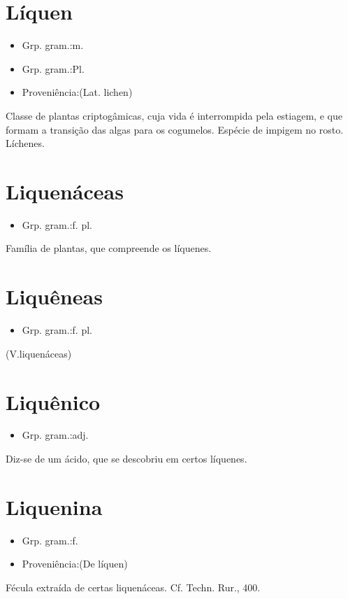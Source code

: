 \section{Líquen}
\begin{itemize}
\item {Grp. gram.:m.}
\end{itemize}
\begin{itemize}
\item {Grp. gram.:Pl.}
\end{itemize}
\begin{itemize}
\item {Proveniência:(Lat. \textunderscore lichen\textunderscore )}
\end{itemize}
Classe de plantas criptogâmicas, cuja vida é interrompida pela estiagem, e que formam a transição das algas para os cogumelos.
Espécie de impigem no rosto.
Líchenes.
\section{Liquenáceas}
\begin{itemize}
\item {Grp. gram.:f. pl.}
\end{itemize}
Família de plantas, que compreende os líquenes.
\section{Liquêneas}
\begin{itemize}
\item {Grp. gram.:f. pl.}
\end{itemize}
(V.liquenáceas)
\section{Liquênico}
\begin{itemize}
\item {Grp. gram.:adj.}
\end{itemize}
Diz-se de um ácido, que se descobriu em certos líquenes.
\section{Liquenina}
\begin{itemize}
\item {Grp. gram.:f.}
\end{itemize}
\begin{itemize}
\item {Proveniência:(De \textunderscore líquen\textunderscore )}
\end{itemize}
Fécula extraída de certas liquenáceas. Cf. \textunderscore Techn. Rur.\textunderscore , 400.
